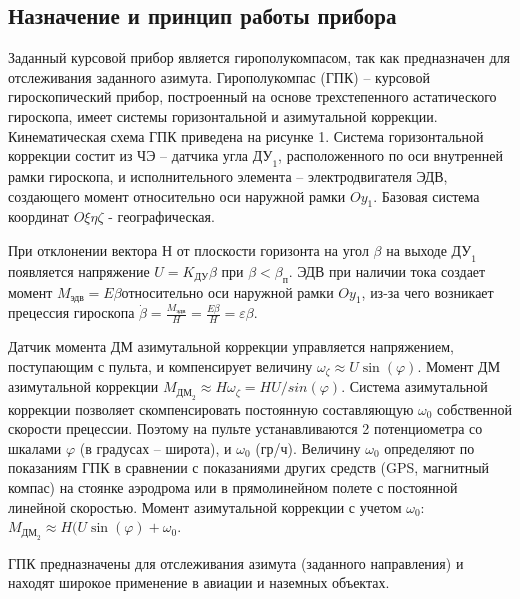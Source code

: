 \documentclass[main.tex]{subfiles}
\begin{document}
\subsection{Назначение и принцип работы прибора}
Заданный курсовой прибор является гирополукомпасом, так как предназначен для отслеживания 
заданного азимута. Гирополукомпас (ГПК) – курсовой гироскопический прибор, построенный 
на основе трехстепенного астатического гироскопа, имеет системы горизонтальной и 
азимутальной коррекции. Кинематическая схема ГПК приведена на рисунке 1. Система 
горизонтальной коррекции состит из ЧЭ – датчика угла \( \text{ДУ}_1 \), расположенного по оси 
внутренней рамки гироскопа, и исполнительного элемента – электродвигателя ЭДВ, 
создающего момент относительно оси наружной рамки \( Oy_1 \). Базовая система 
координат \( O\xi\eta\zeta \) - географическая.\par

При отклонении вектора Н от плоскости горизонта на угол \( \beta \) на выходе \( \text{ДУ}_1 \)
 появляется напряжение \( U=K_\text{ДУ}\beta \) при \( \beta < \beta_\text{п} \). 
 ЭДВ при наличии тока создает момент \( M_\text{эдв}=E\beta \)относительно оси 
 наружной рамки \( Oy_1 \), из-за чего возникает прецессия гироскопа 
 \( \dot{\beta}=\frac{M_\text{эдв}}{H} = \frac{E\beta}{H} = \varepsilon\beta \). \par

Датчик момента ДМ азимутальной коррекции управляется напряжением, поступающим 
с пульта, и компенсирует величину \( \omega_\zeta \approx U\sin(\varphi) \). Момент ДМ
азимутальной коррекции \( M_{\text{ДМ}_2} \approx H\omega_\zeta = HU/sin(\varphi)\).
 Система азимутальной коррекции позволяет скомпенсировать постоянную 
 составляющую \( \omega_0 \) собственной скорости прецессии. Поэтому на пульте
  устанавливаются 2 потенциометра со шкалами \( \varphi \) (в градусах – широта), и 
  \( \omega_0 \) (гр/ч). Величину \( \omega_0 \) определяют по показаниям ГПК в сравнении
   с показаниями других средств (GPS, магнитный компас) на стоянке аэродрома 
   или в прямолинейном полете с постоянной линейной скоростью. Момент азимутальной 
   коррекции с учетом \( \omega_0 \): \( M_{\text{ДМ}_2} \approx H(U\sin(\varphi) + \omega_0 \). \par

ГПК предназначены для отслеживания азимута (заданного направления) и находят 
широкое применение в авиации и наземных объектах.
\end{document}
